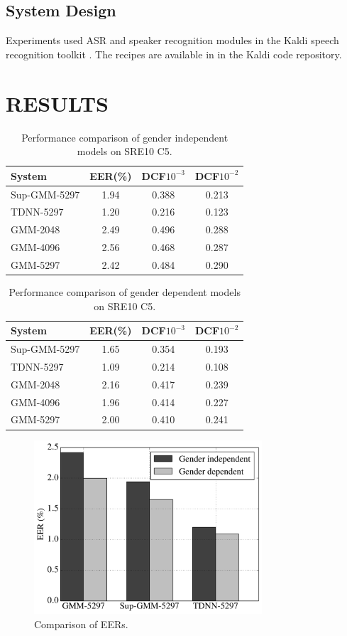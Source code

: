 \documentclass{article}
\begin{document}
\subsection{System Design}
Experiments used ASR and speaker recognition modules in the
Kaldi speech recognition toolkit \cite{kaldi}. The recipes are
available in in the Kaldi code repository.

\section{RESULTS}
\begin{table}
\begin{center}
\begin{tabular}{l|ccc}
\hline
System & EER(\%) & DCF$10^{-3}$ & DCF$10^{-2}$ \\ \hline \hline
Sup-GMM-5297 & 1.94 & 0.388 & 0.213 \\
TDNN-5297 & 1.20 & 0.216 & 0.123 \\
GMM-2048 & 2.49 & 0.496 & 0.288 \\
GMM-4096 & 2.56 & 0.468 & 0.287 \\
GMM-5297 & 2.42 & 0.484 & 0.290 \\ \hline
\end{tabular}
\end{center}
\caption{Performance comparison of gender independent models on SRE10 C5.}
\label{gender_ind}
\end{table}

\begin{table}
\begin{center}
\begin{tabular}{l|ccc}
\hline
System & EER(\%) & DCF$10^{-3}$ & DCF$10^{-2}$ \\ \hline \hline
Sup-GMM-5297 & 1.65 & 0.354 & 0.193 \\
TDNN-5297 & 1.09 & 0.214 & 0.108 \\
GMM-2048 & 2.16 & 0.417 & 0.239 \\
GMM-4096 & 1.96 & 0.414 & 0.227 \\
GMM-5297 & 2.00 & 0.410 & 0.241 \\ \hline
\end{tabular}
\end{center}
\caption{Performance comparison of gender dependent models on SRE10 C5.}
\label{gender_dep}
\end{table}

\begin{figure}[t]
\centerline{\includegraphics[width=8.5cm]{fig/eer}}
\caption{Comparison of EERs.}
\label{fig:eer}
\end{figure}
\end{document}
